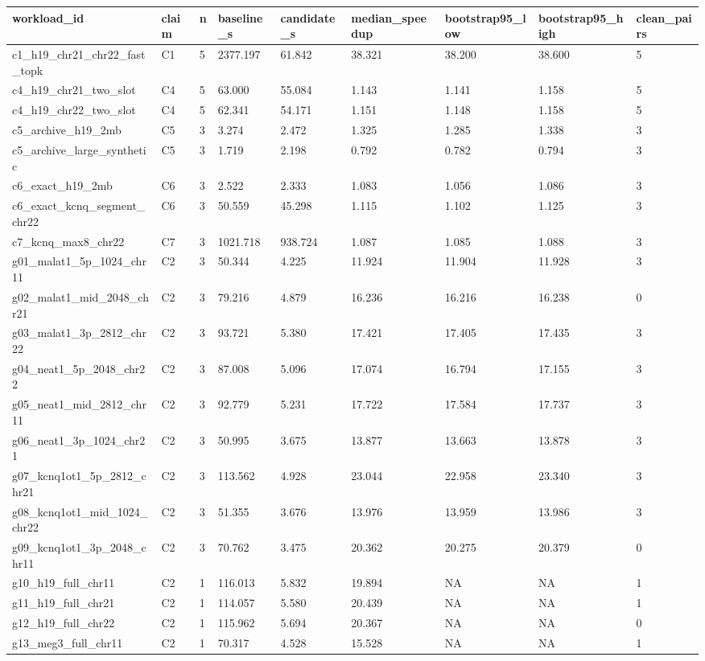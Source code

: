 \begin{tabular}{lllllllll}
\toprule
workload\_id & claim & n & baseline\_s & candidate\_s & median\_speedup & bootstrap95\_low & bootstrap95\_high & clean\_pairs \\
\midrule
c1\_h19\_chr21\_chr22\_fast\_topk & C1 & 5 & 2377.197 & 61.842 & 38.321 & 38.200 & 38.600 & 5 \\
c4\_h19\_chr21\_two\_slot & C4 & 5 & 63.000 & 55.084 & 1.143 & 1.141 & 1.158 & 5 \\
c4\_h19\_chr22\_two\_slot & C4 & 5 & 62.341 & 54.171 & 1.151 & 1.148 & 1.158 & 5 \\
c5\_archive\_h19\_2mb & C5 & 3 & 3.274 & 2.472 & 1.325 & 1.285 & 1.338 & 3 \\
c5\_archive\_large\_synthetic & C5 & 3 & 1.719 & 2.198 & 0.792 & 0.782 & 0.794 & 3 \\
c6\_exact\_h19\_2mb & C6 & 3 & 2.522 & 2.333 & 1.083 & 1.056 & 1.086 & 3 \\
c6\_exact\_kcnq\_segment\_chr22 & C6 & 3 & 50.559 & 45.298 & 1.115 & 1.102 & 1.125 & 3 \\
c7\_kcnq\_max8\_chr22 & C7 & 3 & 1021.718 & 938.724 & 1.087 & 1.085 & 1.088 & 3 \\
g01\_malat1\_5p\_1024\_chr11 & C2 & 3 & 50.344 & 4.225 & 11.924 & 11.904 & 11.928 & 3 \\
g02\_malat1\_mid\_2048\_chr21 & C2 & 3 & 79.216 & 4.879 & 16.236 & 16.216 & 16.238 & 0 \\
g03\_malat1\_3p\_2812\_chr22 & C2 & 3 & 93.721 & 5.380 & 17.421 & 17.405 & 17.435 & 3 \\
g04\_neat1\_5p\_2048\_chr22 & C2 & 3 & 87.008 & 5.096 & 17.074 & 16.794 & 17.155 & 3 \\
g05\_neat1\_mid\_2812\_chr11 & C2 & 3 & 92.779 & 5.231 & 17.722 & 17.584 & 17.737 & 3 \\
g06\_neat1\_3p\_1024\_chr21 & C2 & 3 & 50.995 & 3.675 & 13.877 & 13.663 & 13.878 & 3 \\
g07\_kcnq1ot1\_5p\_2812\_chr21 & C2 & 3 & 113.562 & 4.928 & 23.044 & 22.958 & 23.340 & 3 \\
g08\_kcnq1ot1\_mid\_1024\_chr22 & C2 & 3 & 51.355 & 3.676 & 13.976 & 13.959 & 13.986 & 3 \\
g09\_kcnq1ot1\_3p\_2048\_chr11 & C2 & 3 & 70.762 & 3.475 & 20.362 & 20.275 & 20.379 & 0 \\
g10\_h19\_full\_chr11 & C2 & 1 & 116.013 & 5.832 & 19.894 & NA & NA & 1 \\
g11\_h19\_full\_chr21 & C2 & 1 & 114.057 & 5.580 & 20.439 & NA & NA & 1 \\
g12\_h19\_full\_chr22 & C2 & 1 & 115.962 & 5.694 & 20.367 & NA & NA & 0 \\
g13\_meg3\_full\_chr11 & C2 & 1 & 70.317 & 4.528 & 15.528 & NA & NA & 1 \\
\bottomrule
\end{tabular}
